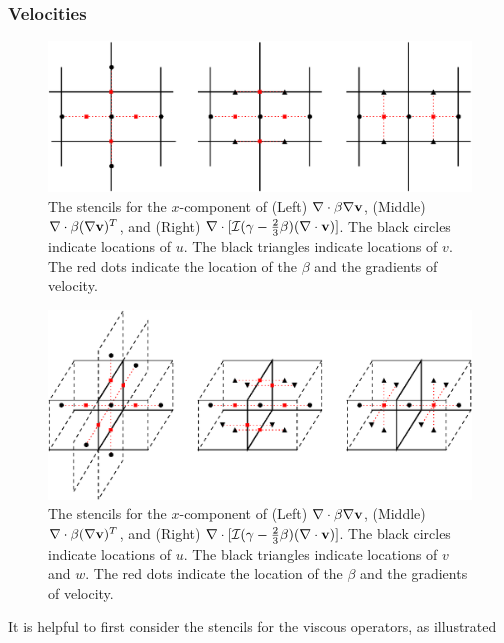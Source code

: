 \documentclass[final]{siamltex}
\def\vb {{\bf v}}
\begin{document}
\subsubsection{Velocities}
\begin{figure}[tb]
\centering
\includegraphics[width=5.25in]{viscOp}
\caption{The stencils for the $x$-component of (Left) $\nabla\cdot\beta\nabla\vb$, (Middle) 
$\nabla\cdot\beta(\nabla\vb)^T$, and (Right) $\nabla\cdot[\mathcal{I}(\gamma-\frac{2}{3}\beta)(\nabla\cdot\vb)]$.  
The black circles indicate locations of $u$.
The black triangles indicate locations of $v$.
The red dots indicate the location of the $\beta$ and the gradients of velocity.}\label{fig:viscOp}
\end{figure}
\begin{figure}[tb]
\centering
\includegraphics[width=5.25in]{viscOp_3d}
\caption{The stencils for the $x$-component of (Left) $\nabla\cdot\beta\nabla\vb$, (Middle) 
$\nabla\cdot\beta(\nabla\vb)^T$, and (Right) $\nabla\cdot[\mathcal{I}(\gamma-\frac{2}{3}\beta)(\nabla\cdot\vb)]$.  
The black circles indicate locations of $u$.
The black triangles indicate locations of $v$ and $w$.
The red dots indicate the location of the $\beta$ and the gradients of velocity.}\label{fig:viscOp_3d}
\end{figure}
It is helpful to first consider the stencils for the viscous operators, as illustrated
\end{document}
